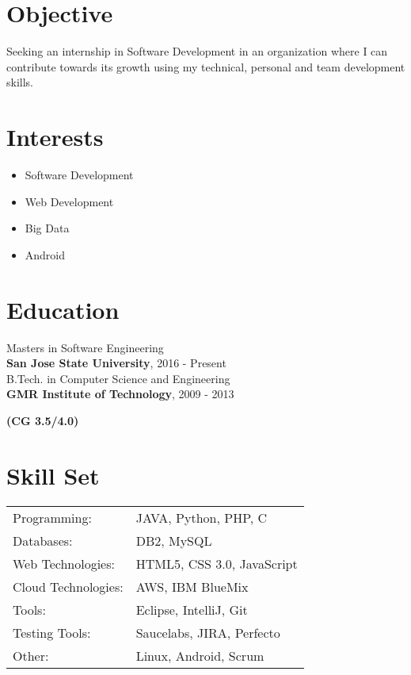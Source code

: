 \documentclass[margin]{res}
\begin{document}

\address{ 3200 Zanker Road,1268 San Jose CA}

\begin{resume}

\section{}
\section{Objective}

  Seeking an internship in Software Development in an organization where I can contribute towards its growth using my technical, personal and team development skills.

\section{Interests}
 \begin{itemize} \itemsep -2pt  %
  \item Software Development 
 \item Web Development
 \item Big Data
 \item Android
 \end{itemize}
\section{Education}
  Masters in Software Engineering \\
  {\bf San Jose State University}, 2016 - Present \\  
  
  B.Tech. in Computer Science and Engineering \\
  {\bf GMR Institute of Technology}, 2009 - 2013 {\bf (CG 3.5/4.0) \\
  
\section{Skill Set}
   \begin{tabular}{l p{3in}}
    {Programming:} & JAVA, Python, PHP, C \\
    {Databases:} &  DB2, MySQL \\
    {Web Technologies:} &  HTML5, CSS 3.0, JavaScript \\
    {Cloud Technologies:} &  AWS, IBM BlueMix \\
    {Tools:} & Eclipse, IntelliJ, Git \\
    {Testing Tools:} & Saucelabs, JIRA, Perfecto \\
    {Other:} & Linux, Android, Scrum \\
     \end{tabular}
     
}
\end{resume}
\end{document}
